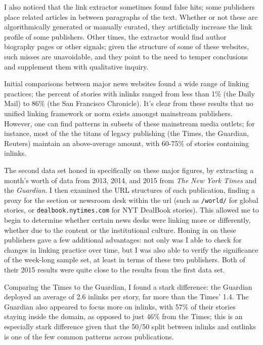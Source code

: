 I also noticed that the link extractor sometimes found false hits; some publishers place related articles in between paragraphs of the text. Whether or not these are algorithmically generated or manually curated, they artificially increase the link profile of some publishers. Other times, the extractor would find author biography pages or other signals; given the structure of some of these websites, such misses are unavoidable, and they point to the need to temper conclusions and supplement them with qualitative inquiry.

Initial comparisons between major news websites found a wide range of linking practices; the percent of stories with inlinks ranged from less than 1\% (the Daily Mail) to 86\% (the San Francisco Chronicle). It's clear from these results that no unified linking framework or norm exists amongst mainstream publishers. However, one can find patterns in subsets of these mainstream media outlets; for instance, most of the the titans of legacy publishing (the Times, the Guardian, Reuters) maintain an above-average amount, with 60-75\% of stories containing inlinks.

The second data set honed in specifically on these major figures, by extracting a month's worth of data from 2013, 2014, and 2015 from \emph{The New York Times} and the \emph{Guardian}. I then examined the URL structures of each publication, finding a proxy for the section or newsroom desk within the url (such as \texttt{/world/} for global stories, or \texttt{dealbook.nytimes.com} for NYT DealBook stories). This allowed me to begin to determine whether certain news desks were linking more or differently, whether due to the content or the institutional culture. Honing in on these publishers gave a few additional advantages: not only was I able to check for changes in linking practice over time, but I was also able to verify the significance of the week-long sample set, at least in terms of these two publishers. Both of their 2015 results were quite close to the results from the first data set.

Comparing the Times to the Guardian, I found a stark difference: the Guardian deployed an average of 2.6 inlinks per story, far more than the Times' 1.4. The Guardian also appeared to focus more on inlinks, with 57\% of their stories staying inside the domain, as opposed to just 46\% from the Times; this is an especially stark difference given that the 50/50 split between inlinks and outlinks is one of the few common patterns across publications.

